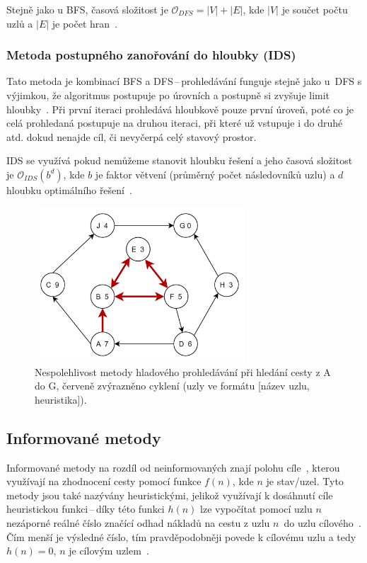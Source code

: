 Stejně jako u BFS, časová složitost je \(\mathcal{O}_{DFS} = |V| + |E|\), kde \(|V|\) je součet počtu uzlů a \(|E|\) je počet hran~\cite{CS225BFSDFS}.

\subsubsection*{\textbullet Metoda postupného zanořování do hloubky (IDS)}
Tato metoda je kombinací BFS a DFS\,--\,prohledávání funguje stejně jako u~DFS s výjimkou, že algoritmus postupuje po úrovních a postupně si zvyšuje limit hloubky~\cite{poole2023artificial}. Při první iteraci prohledává hloubkově pouze první úroveň, poté co je celá prohledaná postupuje na druhou iteraci, při které už vstupuje i do druhé atd. dokud nenajde cíl, či nevyčerpá celý stavový prostor. 

IDS se využívá pokud nemůžeme stanovit hloubku řešení a jeho časová složitost je \(\mathcal{O}_{IDS}(b^{d})\), kde \(b\) je faktor větvení (průměrný počet následovníků uzlu) a \(d\) hloubku optimálního řešení~\cite{izu}.

\begin{figure}[H]
    \centering
    \includegraphics[width=0.7\textwidth]{obrazky-figures/ch2/GreedySearch.png}
    \caption{Nespolehlivost metody hladového prohledávání při hledání cesty z A do G, červeně zvýrazněno cyklení (uzly ve formátu [název uzlu, heuristika]).~\cite{poole2023artificial}}
    \label{fig:GreedySearch}
\end{figure}

\subsection*{Informované metody}
Informované metody na rozdíl od neinformovaných znají polohu cíle~\cite{izu}, kterou využívají na zhodnocení cesty pomocí funkce  ${f(n)}$, kde ${n}$ je stav/uzel. Tyto metody jsou také nazývány heuristickými, jelikož využívají k dosáhnutí cíle heuristickou funkci\,--\,díky této funkci ${h(n)}$ lze vypočítat pomocí uzlu ${n}$ nezáporné reálné číslo značící odhad nákladů na cestu z uzlu ${n}$~do uzlu cílového~\cite{poole2023artificial}. Čím menší je výsledné číslo, tím pravděpodobněji povede k cílovému uzlu a tedy ${h(n) = 0}$, ${n}$ je cílovým uzlem~\cite{AI-Modern_approach}.

